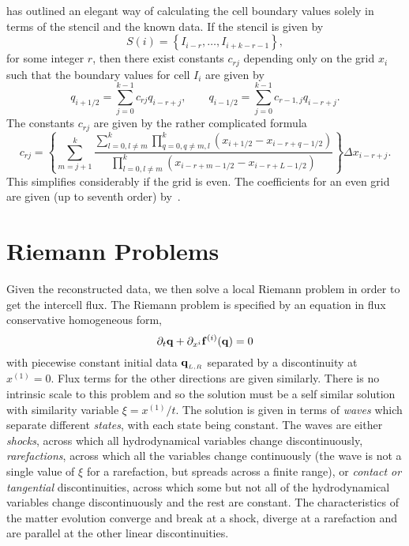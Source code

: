 \documentclass{article}
\begin{document}
\cite{shueno} has outlined an elegant way of calculating the cell
boundary values solely in terms of the stencil and the known data. If
the stencil is given by
\begin{equation}
  \label{enostencil1}
  S(i) = \left\{ I_{i-r}, \dots, I_{i+k-r-1} \right\},
\end{equation}
\noindent for some integer $r$, then there exist constants $c_{rj}$
depending only on the grid $x_i$ such that the boundary
values for cell $I_i$ are given by
\begin{equation}
  \label{enoc1}
  q_{i+1/2} = \sum_{j=0}^{k-1} c_{rj} q_{i-r+j}, \qquad q_{i-1/2} =
  \sum_{j=0}^{k-1} c_{r-1,j} q_{i-r+j}. 
\end{equation}
\noindent The constants $c_{rj}$ are given by the rather complicated
formula 
\begin{equation}
  \label{enoc2}
  c_{rj} = \left\{ \sum_{m=j+1}^k \frac{ \sum_{l=0, l \neq m}^k
  \prod_{q=0, q \neq m, l}^k \left(  x_{i+1/2} - x_{i-r+q-1/2} \right)
  }{ \prod_{l=0, l \neq m}^k \left(  x_{i-r+m-1/2} - x_{i-r+L-1/2}
  \right) }  \right\} \Delta x_{i-r+j}. 
\end{equation}
\noindent This simplifies considerably if the grid is even. The
coefficients for an even grid are given (up to seventh order)
by~\cite{shueno}.

\section{Riemann Problems}
\label{sec:riemann}

Given the reconstructed data, we then solve a local Riemann problem in
order to get the intercell flux. The Riemann problem is specified by
an equation in flux conservative homogeneous form,
\begin{equation}
  \label{eq:homconsform1}
  \partial_t {\bf q} + \partial_{x^i} {\bf f}^{(i)} ({\bf q}) = 0
\end{equation}
with piecewise constant initial data ${\bf q}_{_{L,R}}$ separated by a
discontinuity at $x^{(1)}=0$. Flux terms for the other directions are
given similarly.  There is no intrinsic scale to this problem and so
the solution must be a self similar solution with similarity variable
$\xi = x^{(1)}/t$. The solution is given in terms of {\it waves} which
separate different {\it states}, with each state being constant. The
waves are either {\it shocks}, across which all hydrodynamical
variables change discontinuously, {\it rarefactions}, across which all
the variables change continuously (the wave is not a single value of
$\xi$ for a rarefaction, but spreads across a finite range), or {\it
contact or tangential} discontinuities, across which some but not all
of the hydrodynamical variables change discontinuously and the rest
are constant. The characteristics of the matter evolution converge and
break at a shock, diverge at a rarefaction and are parallel at the
other linear discontinuities.
\end{document}

